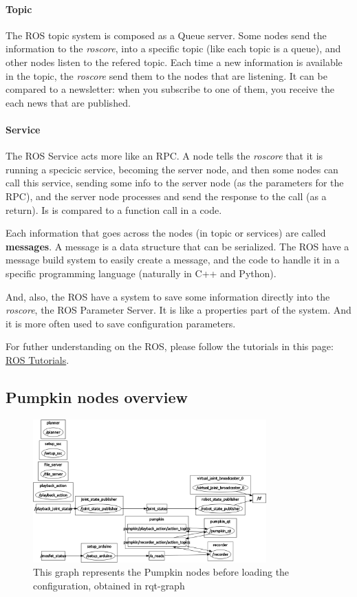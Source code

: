 \documentclass[oneside,a4paper,titlepage]{article}
\begin{document}
\paragraph{Topic} The ROS topic system is composed as a Queue server. Some nodes send the information to the \emph{roscore}, into a specific topic (like each topic is a queue), and other nodes listen to the refered topic. Each time a new information is available in the topic, the \emph{roscore} send them to the nodes that are listening. {\color{blue} It can be compared to a newsletter: when you subscribe to one of them, you receive the each news that are published.}

\paragraph{Service} The ROS Service acts more like an RPC. A node tells the \emph{roscore} that it is running a specicic service, becoming the server node, and then some nodes can call this service, sending some info to the server node (as the parameters for the RPC), and the server node processes and send the response to the call (as a return). {\color{blue} Is is compared to a function call in a code.}

Each information that goes across the nodes (in topic or services) are called \textbf{messages}. A message is a data structure that can be serialized. The ROS have a message build system to easily create a message, and the code to handle it in a specific programming language (naturally in C++ and Python).

And, also, the ROS have a system to save some information directly into the \emph{roscore}, the ROS Parameter Server. It is like a properties part of the system. And it is more often used to save configuration parameters.

For futher understanding on the ROS, please follow the tutorials in this page:
\href{http://wiki.ros.org/ROS/Tutorials}{ROS Tutorials}.

\subsection{Pumpkin nodes overview}

\begin{figure}[ht!]
	\centering
	\includegraphics[width=0.8\textwidth]{graph1}
	\caption[Pumpkin Nodes 1]{This graph represents the Pumpkin nodes before loading the configuration, obtained in rqt-graph}
	\label{fig:nodes1}
\end{figure}
\end{document}
